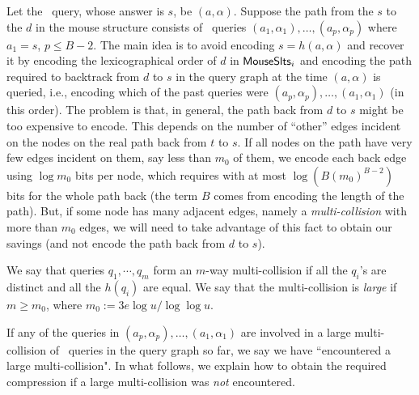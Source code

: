 Let  the \new\ query, whose answer is $s$, be $(a,\alpha)$. Suppose the path from the $s$ to the $d$ in the mouse structure consists of \urep\ queries $(a_1,\alpha_1),\ldots,(a_p,\alpha_p)$ where $a_1=s$, $p\leq B-2$.
%
The main idea is to avoid encoding $s=h(a,\alpha)$ and recover it by encoding the lexicographical order of $d$ in $\mathsf{MouseSlts}_i$ and encoding the path required to backtrack from $d$ to $s$ in the query graph at the time $(a,\alpha)$ is queried, i.e., encoding which of the past queries were $(a_p,\alpha_p),\ldots,(a_1,\alpha_1)$ (in this order). 
The problem is that, in general, the path back from $d$ to $s$ might be too expensive to encode. This depends on the number of ``other'' edges incident on the nodes on the real path back from $t$ to $s$. If all nodes on the path have very few edges incident on them, say less than $m_0$ of them, we encode each back edge using $\log m_0$ bits per node, which requires with at most $\log (B (m_0)^{B-2})$ bits for the whole path back (the term $B$ comes from encoding the length of the path). But, if some node has many adjacent edges, namely a \emph{multi-collision} with more than $m_0$ edges, we will need to take advantage of this fact to obtain our savings (and not encode the path back from $d$ to $s$).

\begin{definition}
We say that queries $q_1,\cdots,q_m$ form an $m$-way multi-collision if all the $q_i$'s are distinct and all the $h(q_i)$ are equal. %
We say that the multi-collision is \emph{large} if $m\geq m_0$, where $m_0:=3e\log u/ \log \log u $. %
\end{definition}
If any of the queries in $(a_p,\alpha_p),\ldots,(a_1,\alpha_1)$ are involved in a large multi-collision of \urep\ queries in the query graph so far, we say we have ``encountered a large multi-collision". In what follows, we explain how to obtain the required compression if a large multi-collision was \emph{not} encountered.


